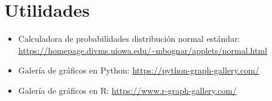 \section{Utilidades}

\begin{itemize}
  \item Calculadora de probabilidades distribución normal estándar: \url{https://homepage.divms.uiowa.edu/~mbognar/applets/normal.html}
  \item Galería de gráficos en Python: \url{https://python-graph-gallery.com/}
  \item Galería de gráficos en R: \url{https://www.r-graph-gallery.com/}
\end{itemize}
